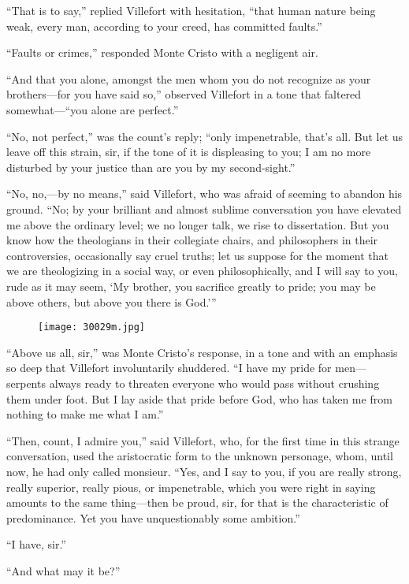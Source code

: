“That is to say,” replied Villefort with hesitation, “that human nature
being weak, every man, according to your creed, has committed faults.”

“Faults or crimes,” responded Monte Cristo with a negligent air.

“And that you alone, amongst the men whom you do not recognize as your
brothers—for you have said so,” observed Villefort in a tone that
faltered somewhat—“you alone are perfect.”

“No, not perfect,” was the count’s reply; “only impenetrable, that’s
all. But let us leave off this strain, sir, if the tone of it is
displeasing to you; I am no more disturbed by your justice than are you
by my second-sight.”

“No, no,—by no means,” said Villefort, who was afraid of seeming to
abandon his ground. “No; by your brilliant and almost sublime
conversation you have elevated me above the ordinary level; we no
longer talk, we rise to dissertation. But you know how the theologians
in their collegiate chairs, and philosophers in their controversies,
occasionally say cruel truths; let us suppose for the moment that we
are theologizing in a social way, or even philosophically, and I will
say to you, rude as it may seem, ‘My brother, you sacrifice greatly to
pride; you may be above others, but above you there is God.’”

\begin{figure}[ht]
\texttt{[image: 30029m.jpg]}
\end{figure}

“Above us all, sir,” was Monte Cristo’s response, in a tone and with an
emphasis so deep that Villefort involuntarily shuddered. “I have my
pride for men—serpents always ready to threaten everyone who would pass
without crushing them under foot. But I lay aside that pride before
God, who has taken me from nothing to make me what I am.”

“Then, count, I admire you,” said Villefort, who, for the first time in
this strange conversation, used the aristocratic form to the unknown
personage, whom, until now, he had only called monsieur. “Yes, and I
say to you, if you are really strong, really superior, really pious, or
impenetrable, which you were right in saying amounts to the same
thing—then be proud, sir, for that is the characteristic of
predominance. Yet you have unquestionably some ambition.”

“I have, sir.”

“And what may it be?”

